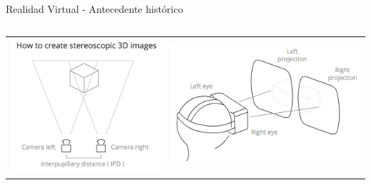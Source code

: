 \begin{frame}{Realidad Virtual - Antecedente hist\'orico}
\begin{columns}
\begin{column}{0.49\textwidth}
\begin{center}
	\begin{tabular}{cc}
	\centering
        \includegraphics[width=0.49\linewidth]{Figs/VirtualReal1} &
        \includegraphics[width=0.49\linewidth]{Figs/VirtualReal2} \\

	\end{tabular}
\end{center}
\end{column}

\end{columns}

\end{frame}




